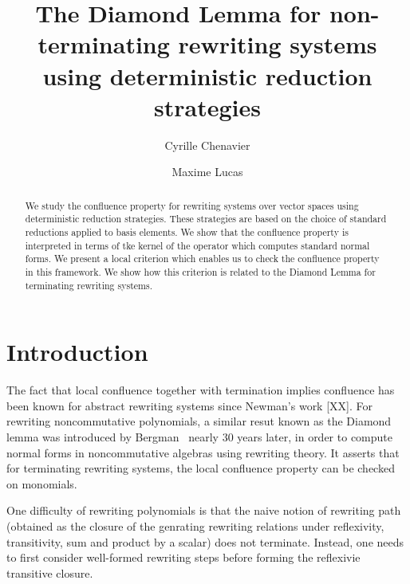 \documentclass[10pt]{easychair}
\theoremstyle{definition}
\begin{document}
\title{The Diamond Lemma for non-terminating rewriting systems using deterministic reduction strategies}

\author{
Cyrille Chenavier
\and
Maxime Lucas
}



\maketitle

\begin{abstract}
  We study the confluence property for rewriting systems over vector spaces using deterministic reduction strategies. These strategies are based on the choice of standard reductions applied to basis elements. We show that the confluence property is interpreted in terms of tke kernel of the operator which computes standard normal forms. We present a local criterion which enables us to check the confluence property in this framework. We show how this criterion is related to the Diamond Lemma for terminating rewriting systems.
\end{abstract}
 
\section{Introduction}

The fact that local confluence together with termination implies confluence has been known for abstract rewriting systems since Newman's work [XX]. For rewriting noncommutative polynomials, a similar resut known as the Diamond lemma  was introduced by Bergman~\cite{MR506890} nearly 30 years later, in order to compute normal forms in noncommutative algebras using rewriting theory. It asserts that for terminating rewriting systems, the local confluence property can be checked on monomials. 

One difficulty of rewriting polynomials is that the naive notion of rewriting path (obtained as the closure of the genrating rewriting relations under reflexivity, transitivity, sum and product by a scalar) does not terminate. Instead, one needs to first consider well-formed rewriting steps before forming the reflexivie transitive closure.
\end{document}
